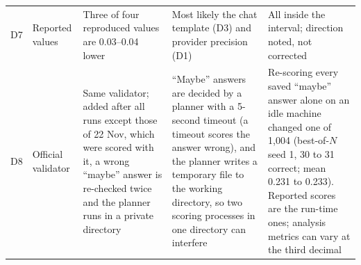 \begin{table}[ht]
\begin{tabular}{@{}p{}p{}p{}p{}p{}@{}}
D7 & Reported values & Three of four reproduced values are 0.03--0.04 lower & Most likely the chat template (D3) and provider precision (D1) & All inside the interval; direction noted, not corrected \\
D8 & Official validator & Same validator; added after all runs except those of 22 Nov, which were scored with it, a wrong ``maybe'' answer is re-checked twice and the planner runs in a private directory & ``Maybe'' answers are decided by a planner with a 5-second timeout (a timeout scores the answer wrong), and the planner writes a temporary file to the working directory, so two scoring processes in one directory can interfere & Re-scoring every saved ``maybe'' answer alone on an idle machine changed one of 1,004 (best-of-$N$ seed 1, 30 to 31 correct; mean 0.231 to 0.233). Reported scores are the run-time ones; analysis metrics can vary at the third decimal \\
\bottomrule
\end{tabular}
\end{table}
